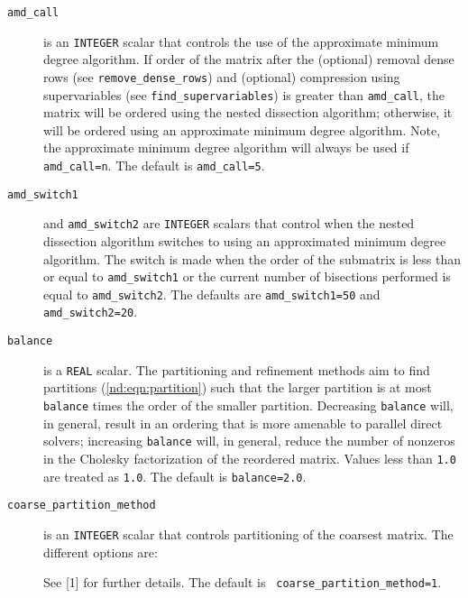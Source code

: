 \begin{description}
\item[\texttt{amd\_call}] is an {\tt INTEGER} scalar that controls the use of 
the approximate minimum degree algorithm. If order of the matrix after the 
(optional) removal dense rows (see {\tt remove\_dense\_rows}) and (optional) 
compression using supervariables (see {\tt find\_supervariables}) is greater 
than {\tt amd\_call}, the matrix will be ordered using the nested dissection 
algorithm; otherwise, it will be ordered using an approximate minimum 
degree algorithm. Note, the approximate minimum degree algorithm will always be used if {\tt amd\_call=n}. The 
default is {\tt amd\_call=5}.

\item[\texttt{amd\_switch1}] and {\tt amd\_switch2} are {\tt INTEGER} scalars 
that control when the nested dissection algorithm switches to using an approximated minimum 
degree algorithm. The switch is made when the order of the submatrix is less 
than or equal to {\tt amd\_switch1} or the current number of 
bisections performed is equal to {\tt amd\_switch2}.  The 
defaults are {\tt amd\_switch1=50} and {\tt amd\_switch2=20}.

\item[\texttt{balance}] is a {\tt REAL} scalar. The partitioning and refinement
methods aim to find partitions (\ref{nd:eqn:partition}) such that the larger 
partition is at most {\tt balance} times the order of the smaller partition. 
Decreasing {\tt balance} will, in
general, result in an ordering that is more amenable to
parallel direct solvers; increasing {\tt balance} will, in general, reduce the
number of nonzeros in the Cholesky factorization of the reordered matrix. 
Values less than {\tt 1.0} are treated as {\tt 1.0}. The
default is {\tt balance=2.0}.


\item[\texttt{coarse\_partition\_method}] is an {\tt INTEGER} scalar that 
controls partitioning of the coarsest matrix. The different options are:
See [1] for further details. The default is {\tt
coarse\_partition\_method=1}. 



\end{description}
